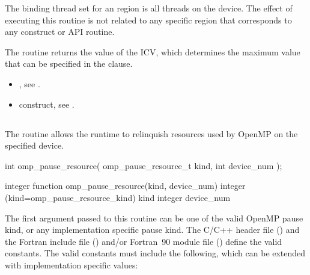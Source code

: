 \binding

The binding thread set for an  region 
is all threads on the device. The effect of executing this routine is 
not related to any specific region that corresponds to any construct or API routine.

\effect

The  routine returns the value of the 
 ICV, which determines the maximum value 
that can be specified in the  clause.

\crossreferences

\begin{itemize}
\item {}, see
.

\item {} construct, see
.
\end{itemize}



\subsection{}
\label{subsec:omp_pause_resource}
\summary

The  routine allows the runtime to 
relinquish resources used by OpenMP on the specified device.

\begin{samepage}
\format
\begin{ccppspecific}
\begin{ompcFunction}
int omp_pause_resource(
  omp_pause_resource_t kind,
  int device_num
);
\end{ompcFunction}
\end{ccppspecific}
\end{samepage}

\begin{fortranspecific}
\begin{ompfFunction}
integer function omp_pause_resource(kind, device_num)
integer (kind=omp_pause_resource_kind) kind
integer device_num
\end{ompfFunction}
\end{fortranspecific}

\constraints

The first argument passed to this routine can be one of the 
valid OpenMP pause kind, or any implementation specific pause 
kind. The C/C++ header file () and the Fortran 
include file () and/or Fortran~90 module file
() define the valid constants. The valid constants 
must include the following, which can be extended with 
implementation specific values:

